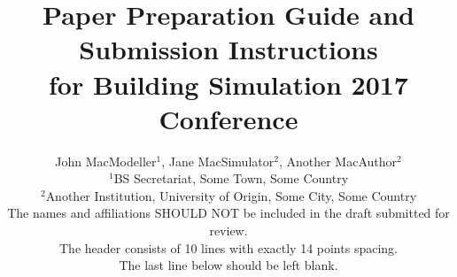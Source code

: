 \usepackage{amsmath, amssymb}
\usepackage{color}
\usepackage{url}
\usepackage{tikz}
\usepackage{pgfplots}
\newtheorem{defn}{Definition}[section]
\newtheorem{rema}[defn]{Remark}
\newcommand\qed{{\unskip\nobreak\hfil\penalty50\hskip2em\vadjust{}
    \nobreak\hfil$\Box$\parfillskip=0pt\finalhyphendemerits=0\par}}

\renewcommand{\Re}{{\mathbb R}}
\newcommand{\Rep}{{\Re_{+}}}
\newcommand{\Na}{{\mathbb N}}
\newcommand{\Z}{{\mathbb Z}}
\newcommand{\codi}[2]{{\mathcal{C}^{#1}(#2)}}

\DeclareMathOperator{\sgn}{sgn}



\title{%
Paper Preparation Guide and Submission Instructions\\	%
\vspace{4pt}
for Building Simulation 2017 Conference %
}

\author{
John MacModeller$^1$, Jane MacSimulator$^2$, Another MacAuthor$^2$\\ %
$^1$BS Secretariat, Some Town, Some Country\\ %
$^2$Another Institution, University of Origin, Some City, Some Country\\ %
The names and affiliations SHOULD NOT be included in the draft submitted for review.\\ %
The header consists of 10 lines with exactly 14 points spacing.\\ %
The last line below should be left blank.} %
\date{\vspace{-0.5cm}}	%
